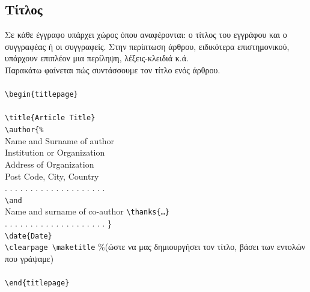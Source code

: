 \documentclass[a4paper, 12pt, oneside, xelatex, final]{article}
\begin{document}
	\subsection{Τίτλος}
	\noindent Σε κάθε έγγραφο υπάρχει χώρος όπου αναφέρονται: ο τίτλος του εγγράφου και ο συγγραφέας ή οι συγγραφείς.	Στην περίπτωση άρθρου, ειδικότερα επιστημονικού, υπάρχουν επιπλέον μια περίληψη, λέξεις-κλειδιά κ.ά. \\
	Παρακάτω φαίνεται πώς συντάσσουμε τον τίτλο ενός άρθρου.\\ \\
	\noindent \verb+\begin{titlepage}+\\
	\hfill\\
	\verb|\title{Article Title}|\\
	\verb|\author{%|\\
		\quad Name and Surname of author\\
		\quad Institution or Organization \\
		\quad Address of Organization\\
		\quad Post Code, City, Country\\
		\quad . . . . . . . . . . . . . . . . . . . .\\
		\quad \verb|\and|\\
		\quad Name and surname of co-author \verb|\thanks{…}|\\
		\quad . . . . . . . . . . . . . . . . . . . .
	\}\\
	\verb|\date{Date}|\\
	\verb|\clearpage \maketitle| \quad \%(ώστε να μας δημιουργήσει τον τίτλο, βάσει των εντολών που γράψαμε)\\
	\hfill\\
	\noindent \verb+\end{titlepage}+
	
\end{document}

